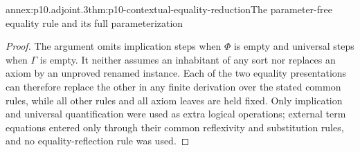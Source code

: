 \begin{annexitem}{annex:p10.adjoint.3}{thm:p10-contextual-equality-reduction}{The parameter-free equality rule and its full parameterization}
\begin{proof}
The argument omits implication steps when \(\Phi\) is empty
and universal steps when \(\Gamma\) is empty. It neither assumes
an inhabitant of any sort nor replaces an axiom by an unproved
renamed instance. Each of the two equality presentations can
therefore replace the other in any finite derivation over the
stated common rules, while all other rules and all axiom leaves
are held fixed. Only implication and universal quantification
were used as extra logical operations; external term equations
entered only through their common reflexivity and substitution
rules, and no equality-reflection rule was used.
\end{proof}
\end{annexitem}
